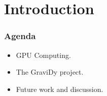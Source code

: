 \section{Introduction}

\begin{frame}
    \frametitle{Agenda}
    \begin{itemize}
        \item GPU Computing.
        \item The GraviDy project.
        \item Future work and discussion.
    \end{itemize}
\end{frame}


%
%
%
%
